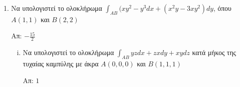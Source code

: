 



\everymath{\displaystyle}
\thispagestyle{empty}




\begin{center}
\end{center}


\vspace{\baselineskip}


\begin{enumerate}
    \item Να υπολογιστεί το ολοκλήρωμα $ \int_{AB} (xy^{2}-y^{3}dx+(x^{2}y-3xy^{2})dy $, \quad όπου $ A(1,1) $ και $ B(2,2) $
        
        \hfill Απ:  $ - \frac{15}{2} $

        \begin{enumerate}[i)]
    \item Να υπολογιστεί το ολοκλήρωμα $ \int_{AB} yzdx + zxdy + xydz  $ κατά μήκος της τυχαίας
        καμπύλης με άκρα $ A(0,0,0) $ και $ B(1,1,1) $

        \hfill Απ: $ 1 $ 

        \end{enumerate}

\end{enumerate}







